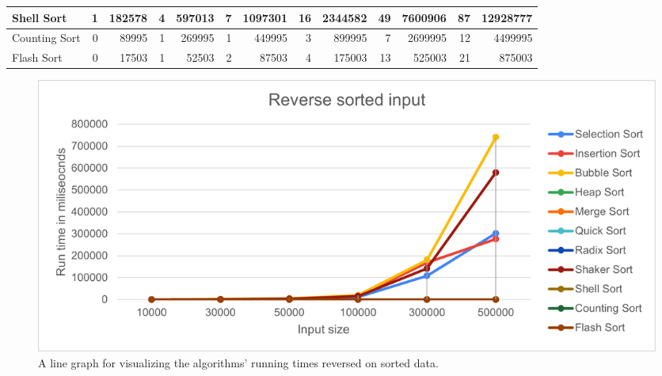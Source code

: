 \documentclass{article}
\begin{document}
\begin{table}[H]
\begin{adjustbox}{width=\columnwidth,center}
\begin{tabular}{|l|rrrrrrrrrrrr|}
Shell Sort                         & \multicolumn{1}{r|}{1}            & \multicolumn{1}{r|}{182578}     & \multicolumn{1}{r|}{4}            & \multicolumn{1}{r|}{597013}     & \multicolumn{1}{r|}{7}            & \multicolumn{1}{r|}{1097301}    & \multicolumn{1}{r|}{16}           & \multicolumn{1}{r|}{2344582}     & \multicolumn{1}{r|}{49}           & \multicolumn{1}{r|}{7600906}     & \multicolumn{1}{r|}{87}           & 12928777                        \\ \hline
Counting Sort                      & \multicolumn{1}{r|}{0}            & \multicolumn{1}{r|}{89995}      & \multicolumn{1}{r|}{1}            & \multicolumn{1}{r|}{269995}     & \multicolumn{1}{r|}{1}            & \multicolumn{1}{r|}{449995}     & \multicolumn{1}{r|}{3}            & \multicolumn{1}{r|}{899995}      & \multicolumn{1}{r|}{7}            & \multicolumn{1}{r|}{2699995}     & \multicolumn{1}{r|}{12}           & 4499995                         \\ \hline
Flash Sort                         & \multicolumn{1}{r|}{0}            & \multicolumn{1}{r|}{17503}      & \multicolumn{1}{r|}{1}            & \multicolumn{1}{r|}{52503}      & \multicolumn{1}{r|}{2}            & \multicolumn{1}{r|}{87503}      & \multicolumn{1}{r|}{4}            & \multicolumn{1}{r|}{175003}      & \multicolumn{1}{r|}{13}           & \multicolumn{1}{r|}{525003}      & \multicolumn{1}{r|}{21}           & 875003                          \\ \hline
\end{tabular}
\end{adjustbox}
\end{table}

\begin{figure}[H]
\includegraphics[scale = 0.8]{!SortedLines.png}
\caption{ A line graph for visualizing the algorithms’ running times reversed on sorted data.}
\centering
\end{figure}
\end{document}
